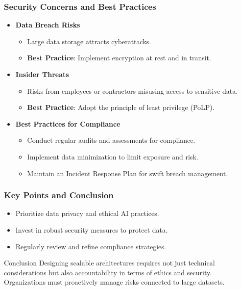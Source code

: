 \documentclass[aspectratio=169]{beamer}
\begin{document}
\begin{frame}[fragile]
    \frametitle{Security Concerns and Best Practices}
    \begin{itemize}
        \item \textbf{Data Breach Risks}
        \begin{itemize}
            \item Large data storage attracts cyberattacks.
            \item \textbf{Best Practice}: Implement encryption at rest and in transit.
        \end{itemize}

        \item \textbf{Insider Threats}
        \begin{itemize}
            \item Risks from employees or contractors misusing access to sensitive data.
            \item \textbf{Best Practice}: Adopt the principle of least privilege (PoLP).
        \end{itemize}
        
        \item \textbf{Best Practices for Compliance}
        \begin{itemize}
            \item Conduct regular audits and assessments for compliance.
            \item Implement data minimization to limit exposure and risk.
            \item Maintain an Incident Response Plan for swift breach management.
        \end{itemize}
    \end{itemize}
\end{frame}

\begin{frame}[fragile]
    \frametitle{Key Points and Conclusion}
    \begin{itemize}
        \item Prioritize data privacy and ethical AI practices.
        \item Invest in robust security measures to protect data.
        \item Regularly review and refine compliance strategies.
    \end{itemize}
    \begin{block}{Conclusion}
        Designing scalable architectures requires not just technical considerations but also accountability in terms of ethics and security. Organizations must proactively manage risks connected to large datasets.
    \end{block}
\end{frame}
\end{document}
